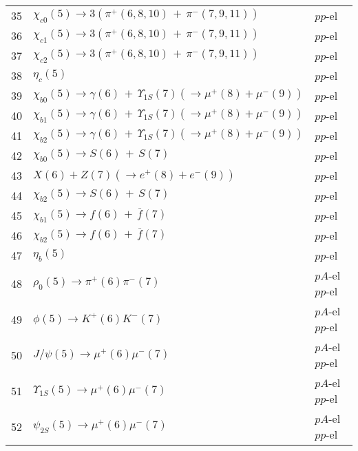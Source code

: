 \documentclass[12pt]{article}
\begin{document}
\begin{center}
\begin{table}[htbp!]
\begin{tabular}{|c|l|l|}
35 & $\chi_{c0}(5)\to 3(\pi^+(6,8,10)\,+\,\pi^-(7,9,11))$ &  $pp$-el  \\

36 & $\chi_{c1}(5)\to 3(\pi^+(6,8,10)\,+\,\pi^-(7,9,11))$ &  $pp$-el  \\

37 & $\chi_{c2}(5)\to 3(\pi^+(6,8,10)\,+\,\pi^-(7,9,11))$ &  $pp$-el  \\

38 & $\eta_c(5)$ &  $pp$-el  \\

39 & $\chi_{b0}(5)\to \gamma(6)\,+\,\Upsilon_{1S}(7)(\to \mu^+(8)+\mu^-(9))$ &  $pp$-el  \\

40 & $\chi_{b1}(5)\to \gamma(6)\,+\,\Upsilon_{1S}(7)(\to \mu^+(8)+\mu^-(9))$ &  $pp$-el  \\

41 & $\chi_{b2}(5)\to \gamma(6)\,+\,\Upsilon_{1S}(7)(\to \mu^+(8)+\mu^-(9))$ &  $pp$-el  \\

42 & $\chi_{b0}(5)\to S(6)\,+\,S(7)$ &  $pp$-el  \\

43 & $X(6) + Z(7)(\to e^+ (8)+ e^- (9))$ &  $pp$-el  \\

44 & $\chi_{b2}(5)\to S(6)\,+\,S(7)$ &  $pp$-el  \\

45 & $\chi_{b1}(5)\to f(6)\,+\,\overline{f}(7)$ &  $pp$-el  \\

46 & $\chi_{b2}(5)\to f(6)\,+\,\overline{f}(7)$ &  $pp$-el  \\

47 &  $\eta_b(5)$ &  $pp$-el  \\

48 & $\rho_0(5)\to \pi^+(6)\pi^-(7)$ &  $pA$-el  $pp$-el  \\

49 & $\phi(5)\to K^+(6)K^-(7)$ &  $pA$-el  $pp$-el  \\

50 & $J/\psi(5)\to \mu^+(6)\mu^-(7)$ &  $pA$-el  $pp$-el  \\

51 & $\Upsilon_{1S}(5)\to \mu^+(6)\mu^-(7)$ &  $pA$-el  $pp$-el  \\

52 & $\psi_{2S}(5)\to \mu^+(6)\mu^-(7)$ &  $pA$-el  $pp$-el  \\


\end{tabular}
\end{table}
\end{center}
\end{document}
